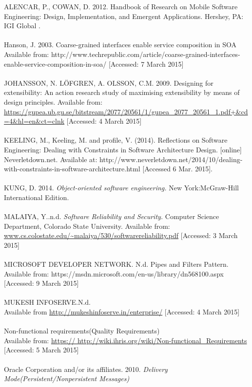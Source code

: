 \documentclass[a4paper]{article}
\begin{document}
ALENCAR, P., COWAN, D. 2012. Handbook of Research on Mobile Software Engineering: Design, Implementation, and Emergent Applications. Hershey, PA: IGI Global .
\\
\\Hanson, J. 2003. Coarse-grained interfaces enable service composition in SOA
\\Available from: http://www.techrepublic.com/article/coarse-grained-interfaces-enable-service-composition-in-soa/
[Accessed: 7 March 2015]
\\
\\JOHANSSON, N. LÖFGREN, A. OLSSON, C.M. 2009. Designing for extensibility: An action research study of maximising extensibility by means of design principles.
Available from: \url{https://gupea.ub.gu.se/bitstream/2077/20561/1/gupea_2077_20561_1.pdf+&cd=4&hl=en&ct=clnk}
[Accessed: 4 March 2015]
\\
\\KEELING, M., Keeling, M. and profile, V. (2014). Reflections on Software Engineering: Dealing with Constraints in Software Architecture Design. [online] Neverletdown.net. Available at: http://www.neverletdown.net/2014/10/dealing-with-constraints-in-software-architecture.html [Accessed 6 Mar. 2015].
\\
\\KUNG, D. 2014. \textit{Object-oriented software engineering.} New York:McGraw-Hill International Edition.
\\
\\MALAIYA, Y..n.d. \textit{Software Reliability and Security.} Computer Science Department, Colorado State University. 
Available from: \url{www.cs.colostate.edu/~malaiya/530/softwarereliability​.pdf}
[Accessed: 3 March 2015]
\\
\\ MICROSOFT DEVELOPER NETWORK. N.d. Pipes and Filters Pattern.
Available from: https://msdn.microsoft.com/en-us/library/dn568100.aspx
[Accessed: 9 March 2015]
\\
\\MUKESH INFOSERVE.N.d.
\\Available from \url{http://mukeshinfoserve.in/enterprise/}
[Accessed: 4 March 2015]
\\
\\Non-functional requirements(Quality Requirements)
\\Available from:  \url{https:// http://wiki.ihris.org/wiki/Non-functional_Requirements}
[Accessed: 5 March 2015]
\\
\\Oracle Corporation and/or its affiliates. 2010. \textit{Delivery Mode(Persistent/Nonpersistent Messages)}
\end{document}
